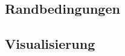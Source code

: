 \documentclass[crop=false,10pt,ngerman]{standalone}
\begin{document}

    \subsection{Randbedingungen} %
    \label{sub:randbedingungen}


    \subsection{Visualisierung} %
    \label{sub:visualisierung}

\end{document}
